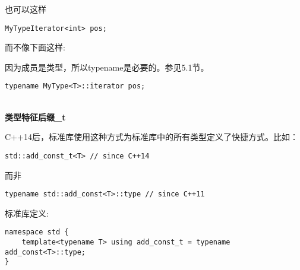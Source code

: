 也可以这样

\begin{lstlisting}[style=styleCXX]
MyTypeIterator<int> pos;
\end{lstlisting}

而不像下面这样:

\begin{tcolorbox}[colback=webgreen!5!white,colframe=webgreen!75!black]
\hspace*{0.75cm}因为成员是类型，所以typename是必要的。参见5.1节。
\end{tcolorbox}

\begin{lstlisting}[style=styleCXX]
typename MyType<T>::iterator pos;
\end{lstlisting}

\hspace*{\fill} \\ %
\noindent
\textbf{类型特征后缀\_t}

C++14后，标准库使用这种方式为标准库中的所有类型定义了快捷方式。比如：

\begin{lstlisting}[style=styleCXX]
std::add_const_t<T> // since C++14
\end{lstlisting}

而非

\begin{lstlisting}[style=styleCXX]
typename std::add_const<T>::type // since C++11
\end{lstlisting}

标准库定义:

\begin{lstlisting}[style=styleCXX]
namespace std {
	template<typename T> using add_const_t = typename add_const<T>::type;
}
\end{lstlisting}




